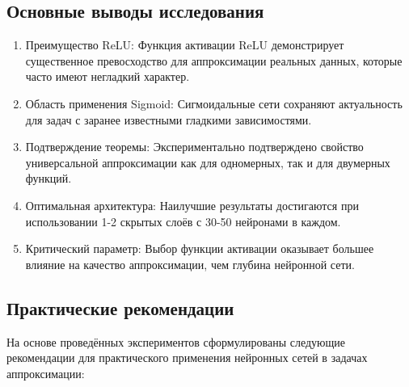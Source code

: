 \documentclass[12pt]{article}
\begin{document}
\subsection{Основные выводы исследования}

\begin{enumerate}
	\item Преимущество ReLU: Функция активации ReLU демонстрирует существенное превосходство для аппроксимации реальных данных, которые часто имеют негладкий характер.
	
	\item Область применения Sigmoid: Сигмоидальные сети сохраняют актуальность для задач с заранее известными гладкими зависимостями.
	
	\item Подтверждение теоремы: Экспериментально подтверждено свойство универсальной аппроксимации как для одномерных, так и для двумерных функций.
	
	\item Оптимальная архитектура: Наилучшие результаты достигаются при использовании 1-2 скрытых слоёв с 30-50 нейронами в каждом.
	
	\item Критический параметр: Выбор функции активации оказывает большее влияние на качество аппроксимации, чем глубина нейронной сети.
\end{enumerate}

\subsection{Практические рекомендации}

На основе проведённых экспериментов сформулированы следующие рекомендации для практического применения нейронных сетей в задачах аппроксимации:
\end{document}
